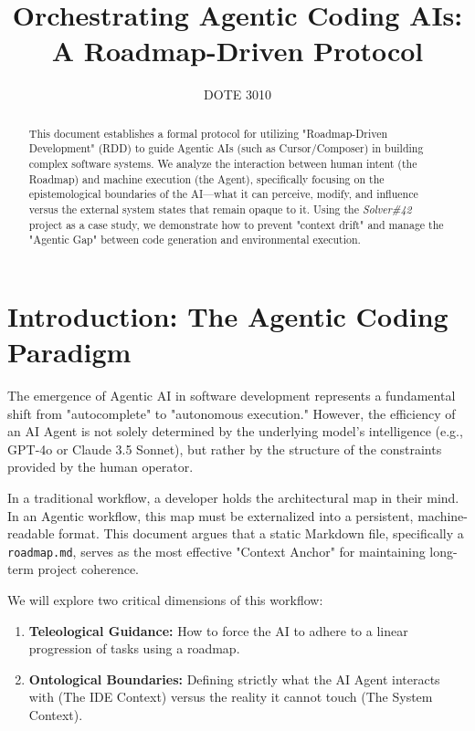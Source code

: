 \documentclass[12pt, a4paper]{article}
\title{\textbf{Orchestrating Agentic Coding AIs: \\ A Roadmap-Driven Protocol}}
\author{DOTE 3010}
\date{}
\begin{document}
\maketitle

\begin{abstract}
    This document establishes a formal protocol for utilizing "Roadmap-Driven Development" (RDD) to guide Agentic AIs (such as Cursor/Composer) in building complex software systems. We analyze the interaction between human intent (the Roadmap) and machine execution (the Agent), specifically focusing on the epistemological boundaries of the AI—what it can perceive, modify, and influence versus the external system states that remain opaque to it. Using the \textit{Solver\#42} project as a case study, we demonstrate how to prevent "context drift" and manage the "Agentic Gap" between code generation and environmental execution.
\end{abstract}

\newpage
\tableofcontents
\newpage

\section{Introduction: The Agentic Coding Paradigm}

The emergence of Agentic AI in software development represents a fundamental shift from "autocomplete" to "autonomous execution." However, the efficiency of an AI Agent is not solely determined by the underlying model's intelligence (e.g., GPT-4o or Claude 3.5 Sonnet), but rather by the structure of the constraints provided by the human operator.

In a traditional workflow, a developer holds the architectural map in their mind. In an Agentic workflow, this map must be externalized into a persistent, machine-readable format. This document argues that a static Markdown file, specifically a \texttt{roadmap.md}, serves as the most effective "Context Anchor" for maintaining long-term project coherence.

We will explore two critical dimensions of this workflow:
\begin{enumerate}
    \item \textbf{Teleological Guidance:} How to force the AI to adhere to a linear progression of tasks using a roadmap.
    \item \textbf{Ontological Boundaries:} Defining strictly what the AI Agent interacts with (The IDE Context) versus the reality it cannot touch (The System Context).
\end{enumerate}
\end{document}
